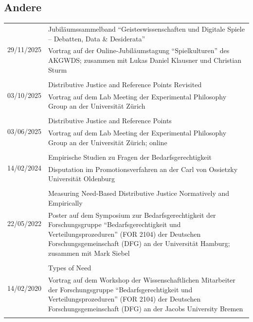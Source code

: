 \documentclass[a4paper,10pt]{article}
\begin{document}
\subsection*{Andere}
\begin{longtable}{p{2.5cm}p{11cm}}
\multirow{2}{2.5cm}{\footnotesize{29/11/2025}} & Jubiläumssammelband \enquote{Geisteswissenschaften und Digitale Spiele -- Debatten, Data \& Desiderata}\\
& \footnotesize{Vortrag auf der Online-Jubiläumstagung \enquote{Spielkulturen} des AKGWDS; zusammen mit Lukas Daniel Klausner und Christian Sturm}\\
\\
\multirow{2}{2.5cm}{\footnotesize{03/10/2025}} & Distributive Justice and Reference Points Revisited\\
& \footnotesize{Vortrag auf dem Lab Meeting der Experimental Philosophy Group an der Universität Zürich}\\
\\
\multirow{2}{2.5cm}{\footnotesize{03/06/2025}} & Distributive Justice and Reference Points\\
& \footnotesize{Vortrag auf dem Lab Meeting der Experimental Philosophy Group an der Universität Zürich; online}\\
\\
\multirow{2}{2.5cm}{\footnotesize{14/02/2024}} & Empirische Studien zu Fragen der Bedarfsgerechtigkeit\\
& \footnotesize{Disputation im Promotionsverfahren an der Carl von Ossietzky Universität Oldenburg}\\
\\
\multirow{2}{2.5cm}{\footnotesize{22/05/2022}} & Measuring Need-Based Distributive Justice Normatively and Empirically\\
& \footnotesize{Poster auf dem Symposium zur Bedarfsgerechtigkeit der Forschungsgruppe \enquote{Bedarfsgerechtigkeit und Verteilungsprozeduren} (FOR 2104) der Deutschen Forschungsgemeinschaft (DFG) an der Universität Hamburg; zusammen mit Mark Siebel}\\
\\
\multirow{2}{2.5cm}{\footnotesize{14/02/2020}} & Types of Need\\
& \footnotesize{Vortrag auf dem Workshop der Wissenschaftlichen Mitarbeiter der Forschungsgruppe \enquote{Bedarfsgerechtigkeit und Verteilungsprozeduren} (FOR 2104) der Deutschen Forschungsgemeinschaft (DFG) an der Jacobs University Bremen}\\
\\

\end{longtable}
\end{document}
